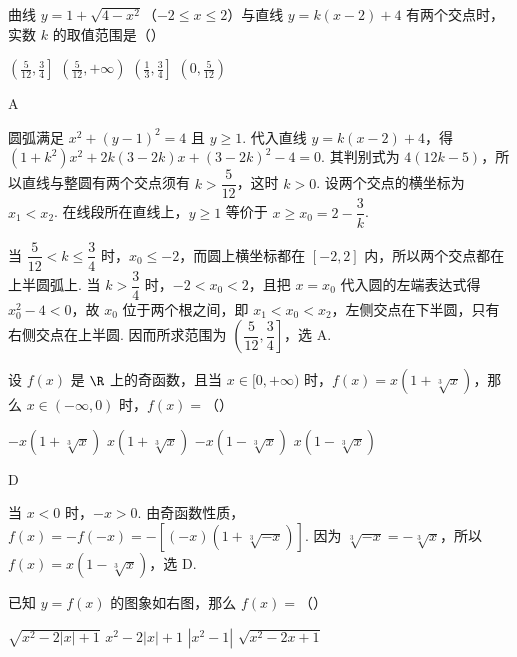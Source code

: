 \begin{problem}
曲线 \(y = 1 + \sqrt{4 - x^2}\)（\(-2 \leqslant x \leqslant 2\)）与直线 \(y = k(x - 2) + 4\) 有两个交点时，实数 \(k\) 的取值范围是（\quad）

\choices
    {\(\left(\frac{5}{12}, \frac{3}{4}\right]\)}
    {\(\left(\frac{5}{12}, +\infty\right)\)}
    {\(\left(\frac{1}{3}, \frac{3}{4}\right]\)}
    {\(\left(0, \frac{5}{12}\right)\)}
\end{problem}

\begin{answer}
A
\end{answer}

\begin{solution}
圆弧满足 \(x^2+(y-1)^2=4\) 且 \(y\geqslant1\). 代入直线 \(y=k(x-2)+4\)，得
\( (1+k^2)x^2+2k(3-2k)x+(3-2k)^2-4=0\). 其判别式为 \(4(12k-5)\)，所以直线与整圆有两个交点须有 \(k>\dfrac5{12}\)，这时 \(k>0\). 设两个交点的横坐标为 \(x_1<x_2\). 在线段所在直线上，\(y\geqslant1\) 等价于 \(x\geqslant x_0=2-\dfrac3k\).

当 \(\dfrac5{12}<k\leqslant\dfrac34\) 时，\(x_0\leqslant-2\)，而圆上横坐标都在 \([-2,2]\) 内，所以两个交点都在上半圆弧上. 当 \(k>\dfrac34\) 时，\(-2<x_0<2\)，且把 \(x=x_0\) 代入圆的左端表达式得 \(x_0^2-4<0\)，故 \(x_0\) 位于两个根之间，即 \(x_1<x_0<x_2\)，左侧交点在下半圆，只有右侧交点在上半圆. 因而所求范围为 \(\left(\dfrac5{12},\dfrac34\right]\)，选 A.
\end{solution}

\begin{problem}
设 \(f(x)\) 是 \(\R\) 上的奇函数，且当 \(x \in [0,+\infty)\) 时，\(f(x) = x\left(1 + \sqrt[3]{x}\right)\)，那么 \(x \in (-\infty,0)\) 时，\(f(x)=\)（\quad）

\choices
    {\(-x\left(1 + \sqrt[3]{x}\right)\)}
    {\(x\left(1 + \sqrt[3]{x}\right)\)}
    {\(-x\left(1 - \sqrt[3]{x}\right)\)}
    {\(x\left(1 - \sqrt[3]{x}\right)\)}
\end{problem}

\begin{answer}
D
\end{answer}

\begin{solution}
当 \(x<0\) 时，\(-x>0\). 由奇函数性质，\(f(x)=-f(-x)=-\left[(-x)\left(1+\sqrt[3]{-x}\right)\right]\). 因为 \(\sqrt[3]{-x}=-\sqrt[3]{x}\)，所以 \(f(x)=x\left(1-\sqrt[3]{x}\right)\)，选 D.
\end{solution}

\begin{problem}
已知 \(y = f(x)\) 的图象如右图，那么 \(f(x)=\)（\quad）


\choices
    {\(\sqrt{x^2 - 2|x| + 1}\)}
    {\(x^2 - 2|x| + 1\)}
    {\(|x^2 - 1|\)}
    {\(\sqrt{x^2 - 2x + 1}\)}
\end{problem}


